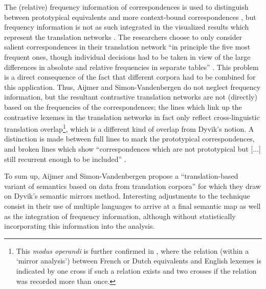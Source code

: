 The (relative) frequency information of correspondences is used to distinguish between prototypical equivalents and more context-bound correspondences \citep[8]{simon-vandenbergen_semantic_2007}, but frequency information is not as such integrated in the visualized results which represent the translation networks \citep[250--253]{simon-vandenbergen_semantic_2007}. The researchers choose to only consider salient correspondences in their translation network “in principle the five most frequent ones, though individual decisions had to be taken in view of the large differences in absolute and relative frequencies in separate tables” \citep[248]{simon-vandenbergen_semantic_2007}. This problem is a direct consequence of the fact that different corpora had to be combined for this application. Thus, Aijmer and Simon-Vandenbergen do not neglect frequency information, but the resultant contrastive translation networks are not (directly) based on the frequencies of the correspondences; the lines which link up the contrastive lexemes in the translation networks in fact only reflect cross-linguistic translation overlap\footnote{This \textit{modus operandi} is further confirmed in \citet[93--94]{simon-vandenbergen_english_2013}, where the relation (within a ‘mirror analysis’) between French or Dutch equivalents and English lexemes is indicated by one cross if such a relation exists and two crosses if the relation was recorded more than once.}, which is a different kind of overlap from Dyvik’s notion. A distinction is made between full lines to mark the prototypical correspondences, and broken lines which show “correspondences which are not prototypical but [...] still recurrent enough to be included” \citep[248]{simon-vandenbergen_semantic_2007}.

To sum up, Aijmer and Simon-Vandenbergen propose a “translation-based variant of semantics based on data from translation corpora” \citep[7]{simon-vandenbergen_semantic_2007} for which they draw on Dyvik’s semantic mirrors method. Interesting adjustments to the technique consist in their use of multiple languages to arrive at a final semantic map as well as the integration of frequency information, although without statistically incorporating this information into the analysis.

